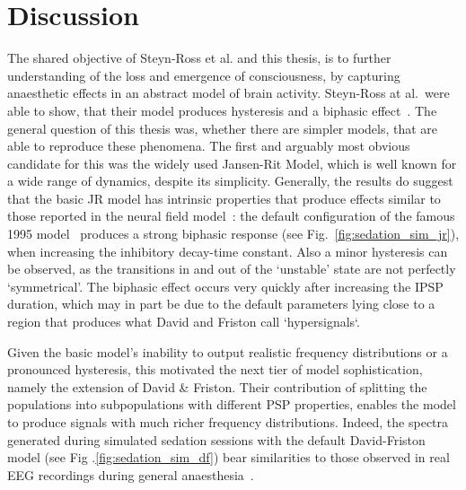 \chapter{Discussion}
The shared objective of Steyn-Ross et al. and this thesis,
is to further understanding of the loss and emergence of consciousness,
by capturing anaesthetic effects in an abstract model of brain activity.
Steyn-Ross at al.\ were able to show,
that their model produces hysteresis and a biphasic effect~\cite{hutt_progress_2011}.
The general question of this thesis was,
whether there are simpler models,
that are able to reproduce these phenomena.
The first and arguably most obvious candidate for this was the widely used Jansen-Rit Model,
which is well known for a wide range of dynamics, despite its simplicity.
Generally, the results do suggest that the basic JR model has intrinsic properties that produce
effects similar to those reported in the neural field model~\cite{hutt_progress_2011}:
the default configuration of the famous 1995 model~\cite{jansen_electroencephalogram_1995}
produces a strong biphasic response (see Fig.~\ref{fig:sedation_sim_jr}),
when increasing the inhibitory decay-time constant.
Also a minor hysteresis can be observed, as the transitions in and out of the `unstable' state are not perfectly
`symmetrical'. 
The biphasic effect occurs very quickly after increasing the IPSP duration, which may in part be due to the default
parameters lying close to a region that produces what David and Friston call `hypersignals`\cite{david_neural_2003}.


Given the basic model's inability to output realistic frequency distributions or a pronounced hysteresis,
this motivated the next tier of model sophistication, namely the extension of David \&
Friston\cite{david_neural_2003}.
Their contribution of splitting the populations into subpopulations with different PSP properties,
enables the model to produce signals with much richer frequency distributions.
Indeed, the spectra generated during simulated sedation sessions with the default David-Friston model
(see Fig .\ref{fig:sedation_sim_df}) bear similarities to those observed in
real EEG recordings during general anaesthesia~\cite{purdon_electroencephalogram_2013}.


